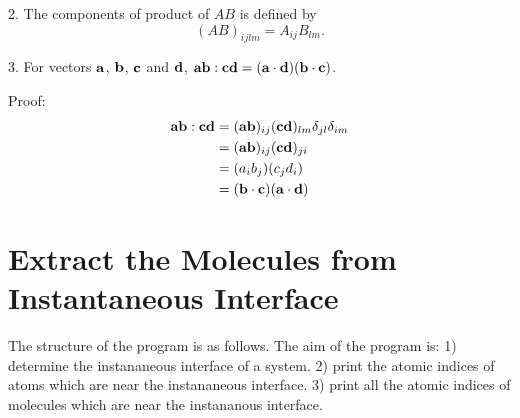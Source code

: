 2. The components of product of $AB$ is defined by 
\begin{equation}
    (AB)_{ijlm}=A_{ij}B_{lm}.
\label{tensor_product}
\end{equation}

3. For vectors $\bf{a}$, $\bf{b}$, $\bf{c}$ and $\bf{d}$, $\bf{ab}:\bf{cd}=(\bf{a}\cdot\bf{d})(\bf{b}\cdot\bf{c})$.

Proof:
\begin{align}
    {\bf{ab}:\bf{cd}}&=({\bf{ab}})_{ij}({\bf{cd}})_{lm}\delta_{jl}\delta_{im} \nonumber \\
    &=({\bf{ab}})_{ij}({\bf{cd}})_{ji} \nonumber\\
    &=(a_i b_j)(c_j d_i) \nonumber\\
    &=(\bf{b}\cdot\bf{c})(\bf{a}\cdot\bf{d})
\end{align}

\section{Extract the Molecules from Instantaneous Interface}
The structure of the program is as follows.
The aim of the program is:
1) determine the instananeous interface of a system.
2) print the atomic indices of atoms which are near the instananeous interface.
3) print all the atomic indices of molecules which are near the instananous interface.

